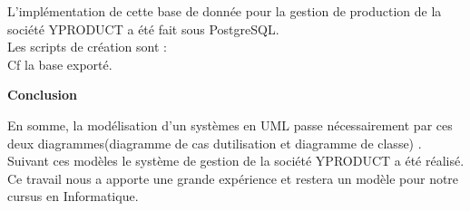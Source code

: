 \documentclass[12pt, openany]{report}
\begin{document}
L’implémentation de cette base de donnée pour la gestion de production de la société YPRODUCT a été fait sous PostgreSQL.\\
Les scripts de création sont :\\
Cf la base exporté.
\begin{center}
\textbf{Conclusion}\\
\end{center}
En somme, la modélisation d’un systèmes en UML passe nécessairement par ces deux diagrammes(diagramme de cas dutilisation et diagramme de classe) . Suivant ces modèles le système de gestion de la société YPRODUCT a été réalisé.\\
Ce travail nous a apporte une grande expérience et restera un modèle pour notre cursus en Informatique.
\end{document}
